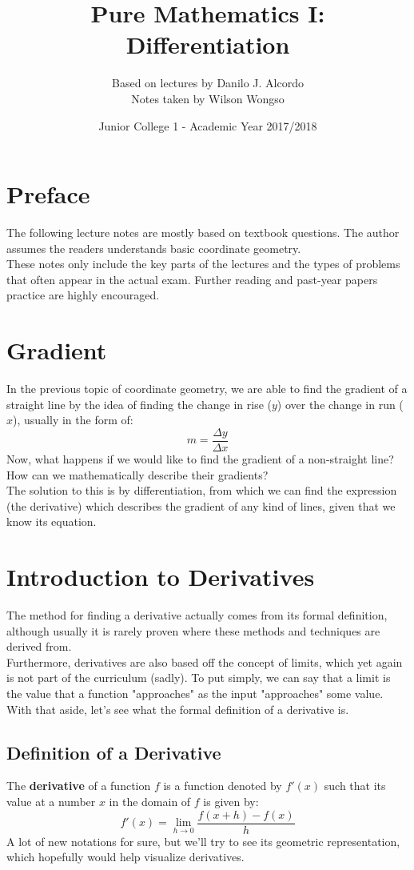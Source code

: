 \documentclass[hidelinks, a4paper, 12pt]{article}
\title{Pure Mathematics I: Differentiation}
\author{Based on lectures by Danilo J. Alcordo \\ Notes taken by Wilson Wongso}
\date{Junior College 1 - Academic Year 2017/2018}
\newcommand{\bd}{\textbf}
\newcommand{\n}{\\[\baselineskip]}
\begin{document}
    
    \maketitle
        
    \tableofcontents

    \section{Preface}
        The following lecture notes are mostly based on textbook \cite{neill2016cambridge} questions. The author assumes the readers understands basic coordinate geometry.\\[\baselineskip]
        These notes only include the key parts of the lectures and the types of problems that often appear in the actual exam.
        Further reading and past-year papers practice are highly encouraged.

    \section{Gradient}
        In the previous topic of coordinate geometry, we are able to find the gradient of a straight line by the idea of finding the change in rise ($y$) over the
        change in run ($x$), usually in the form of:
        \[m = \frac{\Delta y}{\Delta x}\]
        Now, what happens if we would like to find the gradient of a non-straight line? How can we mathematically describe their gradients?\n
        The solution to this is by differentiation, from which we can find the expression (the derivative) which describes the gradient of any kind of lines, given that we know its equation.

    \section{Introduction to Derivatives}
        The method for finding a derivative actually comes from its formal definition, although usually it is rarely proven where these methods and techniques are derived from.\n
        Furthermore, derivatives are also based off the concept of limits, which yet again is not part of the curriculum (sadly). To put simply, we can say that a limit is the value 
        that a function "approaches" as the input "approaches" some value. \cite{stewart2007calculus}\n
        With that aside, let's see what the formal definition of a derivative is.

        \subsection{Definition of a Derivative}
            The \bd{derivative} of a function $f$ is a function denoted by $f'(x)$ such that its value at a number $x$ in the domain of $f$ is given by:
            \[f'(x) = \lim_{h\to0} \frac{f(x+h)-f(x)}{h}\]
            A lot of new notations for sure, but we'll try to see its geometric representation, which hopefully would help visualize derivatives.
\end{document}
